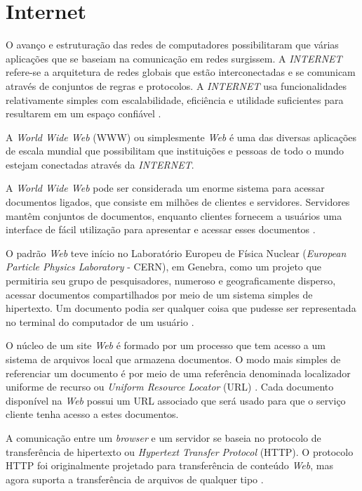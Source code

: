 \section{Internet}
O avanço e estruturação das redes de computadores possibilitaram que várias aplicações que se baseiam na comunicação em redes surgissem. A \emph{INTERNET} refere-se a arquitetura de redes globais que estão interconectadas e se comunicam através de conjuntos de regras e protocolos. A \emph{INTERNET} usa funcionalidades relativamente simples com escalabilidade, eficiência e utilidade suficientes para resultarem em um espaço confiável \cite{www}.

A \emph{World Wide Web} (WWW) ou simplesmente \emph{Web} é uma das diversas aplicações de escala mundial que possibilitam que instituições e pessoas de todo o mundo estejam conectadas através da \emph{INTERNET}.

A \emph{World Wide Web} pode ser considerada um enorme sistema para acessar documentos ligados, que consiste em milhões de clientes e servidores. Servidores mantêm conjuntos de documentos, enquanto clientes fornecem a usuários uma interface de fácil utilização para apresentar e acessar esses documentos \cite{distribuidostanenbaum}.

O padrão \emph{Web} teve início no Laboratório Europeu de Física Nuclear (\emph{European Particle Physics Laboratory} - CERN), em Genebra, como um projeto que permitiria seu grupo de pesquisadores, numeroso e geograficamente disperso, acessar documentos compartilhados por meio de um sistema simples de hipertexto. Um documento podia ser qualquer coisa que pudesse ser representada no terminal do computador de um usuário \cite{distribuidostanenbaum}. 

O núcleo de um site \emph{Web} é formado por um processo que tem acesso a um sistema de arquivos local que armazena documentos. O modo mais simples de referenciar um documento é por meio de uma referência denominada localizador uniforme de recurso ou \emph{Uniform Resource Locator} (URL) \cite{distribuidostanenbaum}. Cada documento disponível na \emph{Web} possui um URL associado que será usado para que o serviço cliente tenha acesso a estes documentos.

A comunicação entre um \emph{browser} e um servidor se baseia no protocolo de transferência de hipertexto ou \emph{Hypertext Transfer Protocol} (HTTP). O protocolo HTTP foi originalmente projetado para transferência de conteúdo \emph{Web}, mas agora suporta a transferência de arquivos de qualquer tipo \cite{fundamentalsofmultimedia}.


